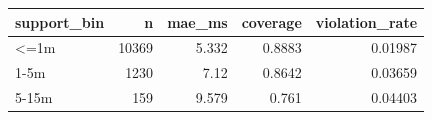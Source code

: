 \begin{tabular}{lrrrr}
\toprule
support_bin & n & mae_ms & coverage & violation_rate \\
\midrule
<=1m & 10369 & 5.332 & 0.8883 & 0.01987 \\
1-5m & 1230 & 7.12 & 0.8642 & 0.03659 \\
5-15m & 159 & 9.579 & 0.761 & 0.04403 \\
\bottomrule
\end{tabular}
